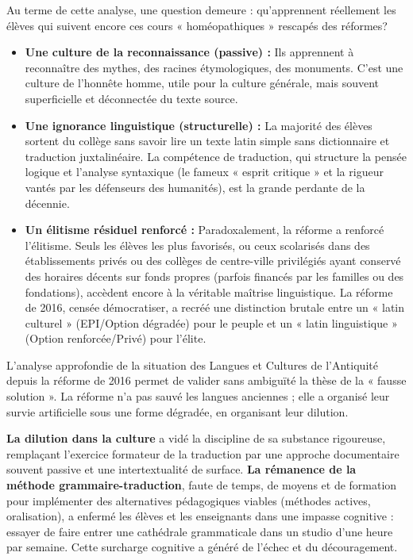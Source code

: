 Au terme de cette analyse, une question demeure : qu'apprennent réellement les élèves qui suivent
encore ces cours « homéopathiques » rescapés des réformes?

\begin{itemize}\item \textbf{Une culture de la reconnaissance (passive) :} Ils apprennent à reconnaître des mythes, des racines étymologiques, des monuments. C'est une culture de l'honnête homme, utile pour la culture générale, mais souvent superficielle et déconnectée du texte source.\item \textbf{Une ignorance linguistique (structurelle) :} La majorité des élèves sortent du collège sans savoir lire un texte latin simple sans dictionnaire et traduction juxtalinéaire. La compétence de traduction, qui structure la pensée logique et l'analyse syntaxique (le fameux « esprit critique » et la rigueur vantés par les défenseurs des humanités), est la grande perdante de la décennie.\item \textbf{Un élitisme résiduel renforcé :} Paradoxalement, la réforme a renforcé l'élitisme. Seuls les élèves les plus favorisés, ou ceux scolarisés dans des établissements privés ou des collèges de centre-ville privilégiés ayant conservé des horaires décents sur fonds propres (parfois financés par les familles ou des fondations), accèdent encore à la véritable maîtrise linguistique. La réforme de 2016, censée démocratiser, a recréé une distinction brutale entre un « latin culturel » (EPI/Option dégradée) pour le peuple et un « latin linguistique » (Option renforcée/Privé) pour l'élite.\end{itemize}L'analyse approfondie de la situation des Langues et Cultures de l'Antiquité depuis la réforme de
2016 permet de valider sans ambiguïté la thèse de la « fausse solution ». La réforme n'a pas sauvé
les langues anciennes ; elle a organisé leur survie artificielle sous une forme dégradée, en
organisant leur dilution.

\textbf{La dilution dans la culture} a vidé la discipline de sa substance rigoureuse, remplaçant
l'exercice formateur de la traduction par une approche documentaire souvent passive et une
intertextualité de surface. \textbf{La rémanence de la méthode grammaire-traduction}, faute de
temps, de moyens et de formation pour implémenter des alternatives pédagogiques viables (méthodes
actives, oralisation), a enfermé les élèves et les enseignants dans une impasse cognitive : essayer
de faire entrer une cathédrale grammaticale dans un studio d'une heure par semaine. Cette surcharge
cognitive a généré de l'échec et du découragement.

